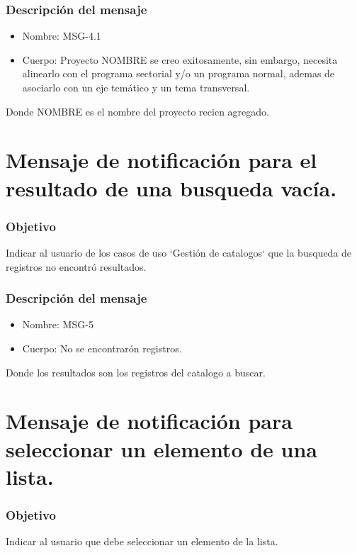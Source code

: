 \subsubsection{Descripción del mensaje}
\begin{itemize}
\item Nombre: MSG-4.1\label{MSG4.1}
\item Cuerpo: Proyecto NOMBRE se creo exitosamente, sin embargo, necesita alinearlo con el programa sectorial y/o un programa normal, ademas de asociarlo con un eje temático y un tema transversal.
\end{itemize}
Donde NOMBRE es el nombre del proyecto recien agregado.


\section{Mensaje de notificación para el resultado de una busqueda vacía.}\label{MSG5}

\subsubsection{Objetivo}
Indicar al usuario de los casos de uso `Gestión de catalogos` que la busqueda de registros no encontró resultados.

\subsubsection{Descripción del mensaje}
\begin{itemize}
\item Nombre: MSG-5
\item Cuerpo: No se encontrarón registros.

\end{itemize}
Donde los resultados son los registros del catalogo a buscar.


\section{Mensaje de notificación para seleccionar un elemento de una lista.}\label{MSG6}

\subsubsection{Objetivo}
Indicar al usuario que debe seleccionar un elemento de la lista.

